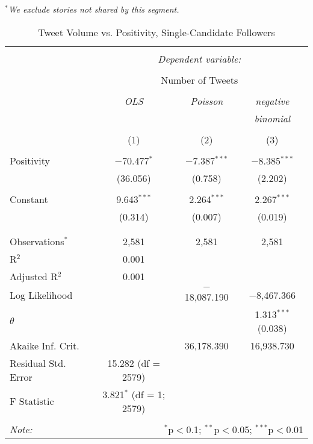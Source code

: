 \emph{$^{*}$We exclude stories not shared by this segment.}  
\newpage 
\begin{table}[!htbp] \centering 
  \caption{Tweet Volume vs. Positivity, Single-Candidate Followers} 
  \label{} 
    \begin{tabular}{@{\extracolsep{5pt}}lccc} 
    \\[-1.8ex]\hline 
    \hline \\[-1.8ex] 
     & \multicolumn{3}{c}{\textit{Dependent variable:}} \\ 
    \cline{2-4} 
    \\[-1.8ex] & \multicolumn{3}{c}{Number of Tweets} \\ 
    \\[-1.8ex] & \textit{OLS} & \textit{Poisson} & \textit{negative} \\ 
     & \textit{} & \textit{} & \textit{binomial} \\ 
    \\[-1.8ex] & (1) & (2) & (3)\\ 
    \hline \\[-1.8ex] 
     Positivity & $-$70.477$^{*}$ & $-$7.387$^{***}$ & $-$8.385$^{***}$ \\ 
      & (36.056) & (0.758) & (2.202) \\ 
      & & & \\ 
     Constant & 9.643$^{***}$ & 2.264$^{***}$ & 2.267$^{***}$ \\ 
      & (0.314) & (0.007) & (0.019) \\ 
      & & & \\ 
    \hline \\[-1.8ex] 
    Observations$^{*}$ & 2,581 & 2,581 & 2,581 \\ 
    R$^{2}$ & 0.001 &  &  \\ 
    Adjusted R$^{2}$ & 0.001 &  &  \\ 
    Log Likelihood &  & $-$18,087.190 & $-$8,467.366 \\ 
    $\theta$ &  &  & 1.313$^{***}$  (0.038) \\ 
    Akaike Inf. Crit. &  & 36,178.390 & 16,938.730 \\ 
    Residual Std. Error & 15.282 (df = 2579) &  &  \\ 
    F Statistic & 3.821$^{*}$ (df = 1; 2579) &  &  \\ 
    \hline 
    \hline \\[-1.8ex] 
    \textit{Note:}  & \multicolumn{3}{r}{$^{*}$p$<$0.1; $^{**}$p$<$0.05; $^{***}$p$<$0.01} \\ 
    \end{tabular} 
\end{table}
